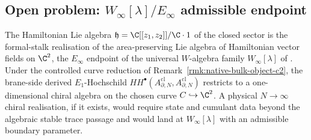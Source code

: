 \subsection{\texorpdfstring{Open problem: $W_\infty[\lambda] / E_\infty$ admissible endpoint}{Open problem: W-infinity[lambda] / E-infinity admissible endpoint}}\label{ssec:open-w-infinity-admissible-endpoint}

The Hamiltonian Lie algebra
\(\mathfrak h=\C[[z_1,z_2]]/\C\cdot 1\) of the closed sector is the
formal-stalk realisation of the area-preserving Lie algebra of Hamiltonian
vector fields on \(\C^2\), the $E_\infty$ endpoint of the universal
\(W\)-algebra family \(W_\infty[\lambda]\) of
\cites{pope-romans-shen}{bakas-w-infinity}.  Under the controlled curve
reduction of Remark~\ref{rmk:native-bulk-object-c2}, the brane-side
derived \(E_1\)-Hochschild
\(HH^\bullet(A^{\mathrm{cl}}_{\partial,N},A^{\mathrm{cl}}_{\partial,N})\)
restricts to a one-dimensional chiral algebra on the chosen curve
\(C\hookrightarrow\C^2\).  A physical \(N\to\infty\) chiral realisation,
if it exists, would require state and cumulant data beyond the algebraic
stable trace passage and would land at \(W_\infty[\lambda]\) with an
admissible boundary parameter.

